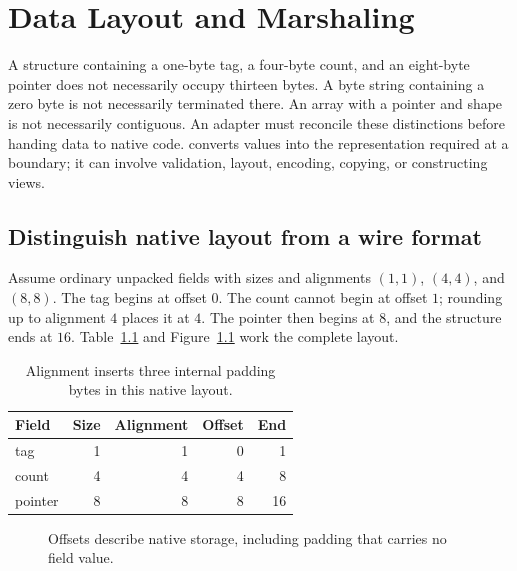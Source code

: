 \chapter{Data Layout and Marshaling}
\label{ch:ffi-marshaling}

A structure containing a one-byte tag, a four-byte count, and an eight-byte pointer does not necessarily occupy thirteen bytes.
A byte string containing a zero byte is not necessarily terminated there.
An array with a pointer and shape is not necessarily contiguous.
An adapter must reconcile these distinctions before handing data to native code.
 converts values into the representation required at a boundary; it can involve validation, layout, encoding, copying, or constructing views.

\section{Distinguish native layout from a wire format}
\label{sec:ch71-layout}
Assume ordinary unpacked fields with sizes and alignments $(1,1)$, $(4,4)$, and $(8,8)$.
The tag begins at offset $0$.
The count cannot begin at offset $1$; rounding up to alignment $4$ places it at $4$.
The pointer then begins at $8$, and the structure ends at $16$.
Table~\ref{tab:ch71-layout} and Figure~\ref{fig:ch71-padding} work the complete layout.

\begin{table}[htbp]
\caption{Alignment inserts three internal padding bytes in this native layout.}
\label{tab:ch71-layout}
\centering
\begin{tabular}{lrrrr}
\toprule
Field & Size & Alignment & Offset & End \\
\midrule
tag & 1 & 1 & 0 & 1 \\
count & 4 & 4 & 4 & 8 \\
pointer & 8 & 8 & 8 & 16 \\
\bottomrule
\end{tabular}
\end{table}

\begin{figure}[htbp]
\centering
{}
\caption{Offsets describe native storage, including padding that carries no field value.}
\label{fig:ch71-padding}
\end{figure}


